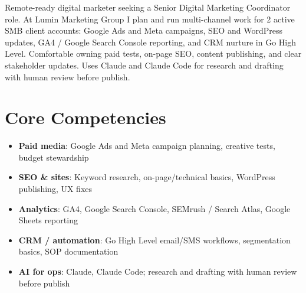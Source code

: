 \documentclass[11pt,a4paper,sans]{moderncv}
\begin{document}
\makecvtitle

\vspace{6pt}
\small{Remote-ready digital marketer seeking a Senior Digital Marketing Coordinator role. At Lumin Marketing Group I plan and run multi-channel work for 2 active SMB client accounts: Google Ads and Meta campaigns, SEO and WordPress updates, GA4 / Google Search Console reporting, and CRM nurture in Go High Level. Comfortable owning paid tests, on-page SEO, content publishing, and clear stakeholder updates. Uses Claude and Claude Code for research and drafting with human review before publish.}

\section{Core Competencies}
\vspace{1pt}
\begin{itemize}
\item \textbf{Paid media}: Google Ads and Meta campaign planning, creative tests, budget stewardship
\item \textbf{SEO \& sites}: Keyword research, on-page/technical basics, WordPress publishing, UX fixes
\item \textbf{Analytics}: GA4, Google Search Console, SEMrush / Search Atlas, Google Sheets reporting
\item \textbf{CRM / automation}: Go High Level email/SMS workflows, segmentation basics, SOP documentation
\item \textbf{AI for ops}: Claude, Claude Code; research and drafting with human review before publish
\end{itemize}
\end{document}
